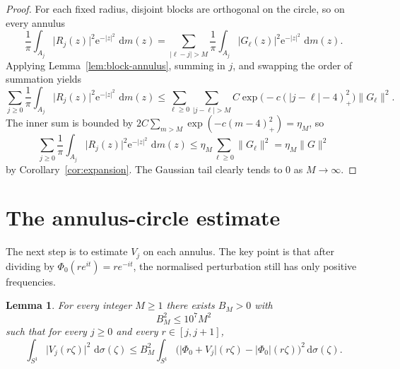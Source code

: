 \documentclass[11pt]{amsart}
\newtheorem{lemma}[theorem]{Lemma}
\theoremstyle{remark}
\newcommand{\abs}[1]{\lvert #1 \rvert}
\newcommand{\norm}[1]{\lVert #1 \rVert}
\newcommand{\dd}{\,\mathrm{d}}
\newcommand{\ee}{\mathrm{e}}
\begin{document}
\begin{proof}
For each fixed radius, disjoint blocks are orthogonal on the circle, so on
every annulus
\[
\frac1\pi \int_{A_j} \abs{R_j(z)}^2 \ee^{-\abs{z}^2}\,\dd m(z)
=
\sum_{\abs{\ell-j}>M}
\frac1\pi \int_{A_j} \abs{G_\ell(z)}^2 \ee^{-\abs{z}^2}\,\dd m(z).
\]
Applying Lemma~\ref{lem:block-annulus}, summing in $j$, and swapping the order
of summation yields
\[
\sum_{j\ge0}
\frac1\pi \int_{A_j} \abs{R_j(z)}^2 \ee^{-\abs{z}^2}\,\dd m(z)
\le
\sum_{\ell\ge0}
\sum_{\abs{j-\ell}>M}
C \exp\!\bigl(-c(\abs{j-\ell}-4)_+^2\bigr)\norm{G_\ell}^2.
\]
The inner sum is bounded by
$2C\sum_{m>M}\exp(-c(m-4)_+^2)=\eta_M$, so
\[
\sum_{j\ge0}
\frac1\pi \int_{A_j} \abs{R_j(z)}^2 \ee^{-\abs{z}^2}\,\dd m(z)
\le
\eta_M \sum_{\ell\ge0}\norm{G_\ell}^2
=
\eta_M \norm{G}^2
\]
by Corollary~\ref{cor:expansion}. The Gaussian tail clearly tends to $0$ as
$M\to\infty$.
\end{proof}

\section{The annulus-circle estimate}

The next step is to estimate $V_j$ on each annulus. The key point is that
after dividing by $\Phi_0(re^{it}) = r e^{-it}$, the normalised perturbation
still has only positive frequencies.

\begin{lemma}\label{lem:annulus-circle}
For every integer $M \ge 1$ there exists $B_M>0$ with
\[
B_M^2 \le 10^7 M^2
\]
such that for every $j \ge 0$ and every $r \in [j,j+1]$,
\[
\int_{S^1} \abs{V_j(r\zeta)}^2\,\dd \sigma(\zeta)
\le
B_M^2 \int_{S^1}
\bigl(\abs{\Phi_0 + V_j}(r\zeta) - \abs{\Phi_0}(r\zeta)\bigr)^2
\dd \sigma(\zeta).
\]
\end{lemma}
\end{document}
